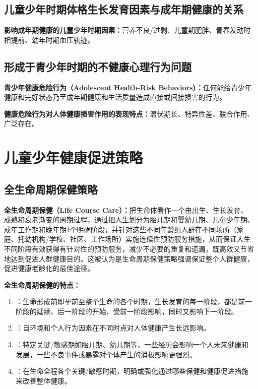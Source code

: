 \subsection{儿童少年时期体格生长发育因素与成年期健康的关系}

\begin{defbox}
\textbf{影响成年期健康的儿童少年时期因素：}营养不良/过剩、儿童期肥胖、青春发动时相提前、幼年时期血压轨迹。
\end{defbox}

\subsection{形成于青少年时期的不健康心理行为问题}

\begin{defbox}
\textbf{青少年健康危险行为（Adolescent Health-Risk Behaviors）：}任何能给青少年健康和完好状态乃至成年期健康和生活质量造成直接或间接损害的行为。

\textbf{健康危险行为对人体健康损害作用的表现特点：}潜伏期长、特异性差、联合作用、广泛存在。
\end{defbox}

\section{儿童少年健康促进策略}
\label{sec:promotion-strategies}

\subsection{全生命周期保健策略}

\begin{keybox}
\textbf{全生命周期保健（Life Course Care）：}把生命体看作一个由出生、生长发育、成熟和衰老渐变的周期过程，通过把人生划分为胎儿期和婴幼儿期、儿童少年期、成年工作期和晚年期4个明确阶段，并针对这些不同年龄组人群在不同场所（家庭、托幼机构/学校、社区、工作场所）实施连续性预防服务措施，从而保证人生不同阶段有效获得有针对性的预防服务，减少不必要的重复和遗漏，既高效又节省地达到促进人群健康目的。这被认为是生命周期保健策略强调保证整个人群健康，促进健康老龄化的最佳途径。
\end{keybox}

\begin{defbox}
\textbf{全生命周期保健的特点：}

\begin{enumerate}[leftmargin=*]
    \item {}：生命形成前即孕前至整个生命的各个时期，生长发育的每一阶段，都是前一阶段的延续、后一阶段的开始，受前一阶段影响，同时又影响下一阶段。
    \item {}：自环境和个人行为因素在不同时点对人体健康产生长远影响。
    \item {}：特定关键/敏感期如胎儿期、幼儿期等，一些经历会影响一个人未来健康和发展，一些不良事件或暴露对个体产生的消极影响更强烈。
    \item {}：在生命全程各个关键/敏感时期，明确或强化通过哪些保健和健康促进措施来改善整体健康。
\end{enumerate}
\end{defbox}

